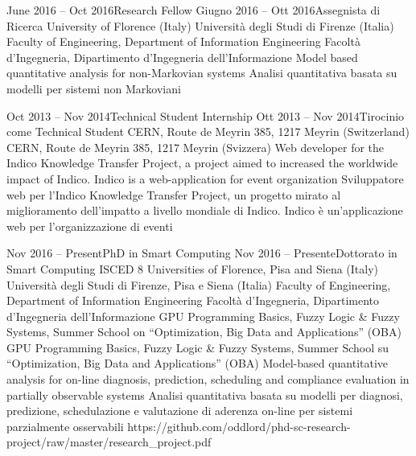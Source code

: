{    \job
    {June 2016 -- Oct 2016}{Research Fellow}
    {Giugno 2016 -- Ott 2016}{Assegnista di Ricerca}
      \jobLocation
        {University of Florence (Italy)}
        {Università degli Studi di Firenze (Italia)}
      \jobDepartment
        {Faculty of Engineering, Department of Information Engineering}
        {Facoltà d'Ingegneria, Dipartimento d'Ingegneria dell'Informazione}
      \jobDescription
        {Model based quantitative analysis for non-Markovian systems}
        {Analisi quantitativa basata su modelli per sistemi non Markoviani}
    
    \job
    {Oct 2013 -- Nov 2014}{Technical Student Internship}
    {Ott 2013 -- Nov 2014}{Tirocinio come Technical Student}
      \jobLocation
        {CERN, Route de Meyrin 385, 1217 Meyrin (Switzerland)}
        {CERN, Route de Meyrin 385, 1217 Meyrin (Svizzera)}
      \jobDescription
        {Web developer for the Indico Knowledge Transfer Project, a project aimed to increased the worldwide impact of Indico. Indico is a web-application for event organization}
        {Sviluppatore web per l'Indico Knowledge Transfer Project, un progetto mirato al miglioramento dell'impatto a livello mondiale di Indico. Indico è un'applicazione web per l'organizzazione di eventi}


  \educationAndTraining
  
    \school
    {Nov 2016 -- Present}{PhD in Smart Computing}
    {Nov 2016 -- Presente}{Dottorato in Smart Computing}
    {ISCED 8}
      \schoolLocation
        {Universities of Florence, Pisa and Siena (Italy)}
        {Università degli Studi di Firenze, Pisa e Siena (Italia)}
      \schoolFaculty
        {Faculty of Engineering, Department of Information Engineering}
        {Facoltà d'Ingegneria, Dipartimento d'Ingegneria dell'Informazione}
      \courses
        {GPU Programming Basics, Fuzzy Logic \& Fuzzy Systems, Summer School on ``Optimization, Big Data and Applications'' (OBA)}
        {GPU Programming Basics, Fuzzy Logic \& Fuzzy Systems, Summer School su ``Optimization, Big Data and Applications'' (OBA)}
      \thesisURL
        {Model-based quantitative analysis for on-line diagnosis, prediction, scheduling and compliance evaluation in partially observable systems}
        {Analisi quantitativa basata su modelli per diagnosi, predizione, schedulazione e valutazione di aderenza on-line per sistemi parzialmente osservabili}
        {https://github.com/oddlord/phd-sc-research-project/raw/master/research_project.pdf}

}
